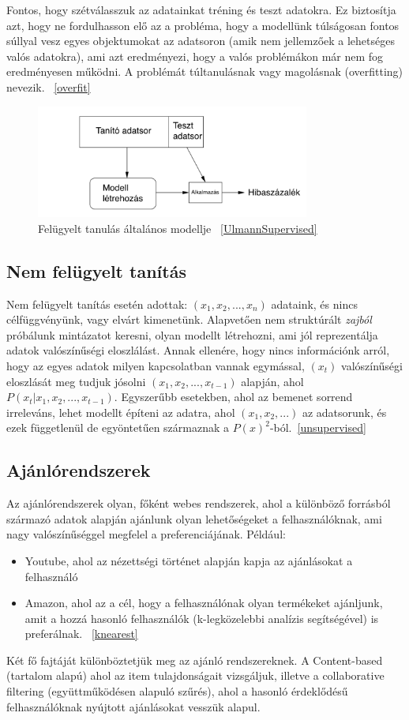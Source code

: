 \documentclass[a4paper,12pt]{article}
\begin{document}
Fontos, hogy szétválasszuk az adatainkat tréning és teszt adatokra. Ez biztosítja azt, hogy ne fordulhasson elő az a probléma, hogy a modellünk túlságosan fontos súllyal vesz egyes objektumokat az adatsoron (amik nem jellemzőek a lehetséges valós adatokra), ami azt eredményezi, hogy a valós problémákon már nem fog eredményesen működni. A problémát túltanulásnak vagy magolásnak (overfitting) nevezik. ~\ref{overfit}


\begin{figure}[ht!]
\centering
\includegraphics[width=90mm]{img/ml.png}
\caption{Felügyelt tanulás általános modellje ~\ref{UlmannSupervised} \label{ml}}
\end{figure}

\subsection{Nem felügyelt tanítás}
Nem felügyelt tanítás esetén adottak: $(x_1, x_2, ..., x_n)$ adataink, és nincs célfüggvényünk, vagy elvárt kimenetünk. Alapvetően nem struktúrált \textsl{zajból} próbálunk mintázatot keresni, olyan modellt létrehozni, ami jól reprezentálja adatok valószínűségi eloszlálást. Annak ellenére, hogy nincs információnk arról, hogy az egyes adatok milyen kapcsolatban vannak egymással, $(x_t)$ valószínűségi eloszlását meg tudjuk jósolni  $(x_1,x_2, ..., x_{t-1})$ alapján, ahol $P(x_t|x_1,x_2, ..., x_{t-1})$.
Egyszerűbb esetekben, ahol az bemenet sorrend irreleváns, lehet modellt építeni az adatra, ahol $(x_1, x_2, ...)$ az adatsorunk, és ezek függetlenül de egyöntetűen származnak a $P(x)^2$-ból.~\ref{unsupervised}

\subsection{Ajánlórendszerek}
Az ajánlórendszerek olyan, főként webes rendszerek, ahol a különböző forrásból származó adatok alapján ajánlunk olyan lehetőségeket a felhasználóknak, ami nagy valószínűséggel megfelel a preferenciájának. Például:
\begin{itemize}
\item Youtube, ahol az nézettségi történet alapján kapja az ajánlásokat a felhasználó
\item Amazon, ahol az a cél, hogy a felhasználónak olyan termékeket ajánljunk, amit a hozzá hasonló felhasználók (k-legközelebbi analízis segítségével) is preferálnak. ~\ref{knearest}
\end{itemize}
Két fő fajtáját különböztetjük meg az ajánló rendszereknek. A Content-based (tartalom alapú) ahol az item tulajdonságait vizsgáljuk, illetve a collaborative filtering (együttműködésen alapuló szűrés), ahol a hasonló érdeklődésű felhasználóknak nyújtott ajánlásokat vesszük alapul. \linebreak
\end{document}
